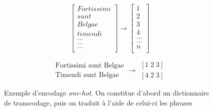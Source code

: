 
\begin{figure}[h]
    \centering
    \noindent\begin{minipage}{.32\linewidth}
        \begin{equation*}
            \begin{bmatrix}
            Fortissimi \\ 
            sunt \\ 
            Belgae \\ 
            timendi \\ 
            ... \\ 
            ... \\ 
            ... \\ 
            \end{bmatrix}
            \rightarrow \begin{bmatrix}
            1 \\ 
            2 \\ 
            3 \\ 
            4 \\ 
            ... \\ 
            ... \\ 
            n \\ 
            \end{bmatrix}
        \end{equation*}
    \end{minipage}%
    \hfill%
    \begin{minipage}{.32\linewidth}
        \begin{equation*}
            \begin{matrix}
            \textrm{Fortissimi sunt Belgae}\\ 
            \textrm{Timendi sunt Belgae}
            \end{matrix}
            \rightarrow
            \begin{matrix}
            \left [ 1\;  2\;  3 \right ]\\ 
            \left [ 4\;  2\;  3 \right ]
            \end{matrix}
        \end{equation*}
    \end{minipage}
    \caption{Exemple d'encodage \textit{one-hot}. On constitue d'abord un dictionnaire de transcodage, puis on traduit à l'aide de celui-ci les phrases}
    \label{deep-learning:one-hot-encoding}
\end{figure}
